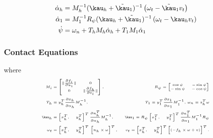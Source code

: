 \begin{frame}
\begin{itemize}
			\begin{subequations}
				\begin{align}
				\dot{\alpha}_h &= M_h^{-1}(\kau_h + \tilde{\kau}_1)^{-1} \left(\omega_t - \tilde{\kau}_1v_t\right) \\
				\dot{\alpha}_1 &= M_1^{-1}R_\psi(\kau_h + \tilde{\kau}_1)^{-1} \left(\omega_t - {\kau}_h v_t\right) \\
				\dot{\psi} &=\omega_n + T_h M_h \dot{\alpha}_h +  T_1 M_1 \dot{\alpha}_1
				\end{align}
				\label{eq:contact_eqs}
			\end{subequations}
	\end{itemize}
\end{frame}

\begin{frame}
	\frametitle{Contact Equations}
	\tiny where
	\begin{subequations}
		\tiny
		\begin{align}
		M_i &= \begin{bmatrix}
		\|\frac{\partial f_i}{\partial u_i}\| & 0 \\
		0 & \|\frac{\partial f_h}{\partial v_i}\|
		\end{bmatrix}, \,
		&R_\psi = \begin{bmatrix}
		\cos \psi & -\sin \psi \\ -\sin \psi & -\cos \psi
		\end{bmatrix} \\
		T_h &=y_h^T \frac{\partial x_h}{\partial \alpha_h}M_h^{-1}, \,
		&T_1 =y_1^T \frac{\partial x_1}{\partial \alpha_1}M_1^{-1},  \,
		\omega_n = z_h^T \omega \\
		\kau_h &= \begin{bmatrix}
		x_h^T, & y_h^T
		\end{bmatrix}^T \frac{\partial n_h^T}{\partial \alpha_h}M_h^{-1}, \,
		&\kau_1 = R_\psi \begin{bmatrix}
		x_1^T, & y_1^T
		\end{bmatrix}^T \frac{\partial n_1^T}{\partial \alpha_1}M_1^{-1} R_\psi \\
		\omega_t &= \begin{bmatrix}
		x_h^T, & y_h^T
		\end{bmatrix}^T \,
		\begin{bmatrix}
		n_h \times \omega
		\end{bmatrix}^T, \,
		&v_t =  \begin{bmatrix}
		x_h^T, & y_h^T
		\end{bmatrix}^T
		\begin{bmatrix}
		(-f_h \times \omega + v)
		\end{bmatrix}^T.
		\end{align}
		\label{eq:contact_eqs_compos}
	\end{subequations}
\end{frame}

